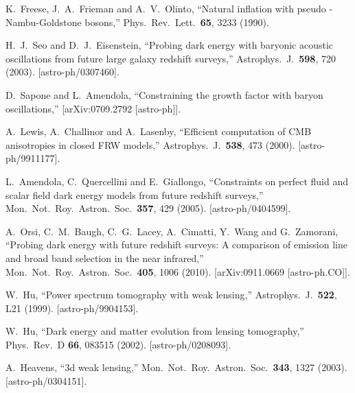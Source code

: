 \documentclass[12pt]{article}
\begin{document}
\begin{thebibliography}{99}
  K.~Freese, J.~A.~Frieman and A.~V.~Olinto,
  ``Natural inflation with pseudo - Nambu-Goldstone bosons,''
  Phys.\ Rev.\ Lett.\  {\bf 65}, 3233 (1990).
  
  
  
  H.~J.~Seo and D.~J.~Eisenstein,
  ``Probing dark energy with baryonic acoustic oscillations from future large galaxy redshift surveys,''
Astrophys.\ J.\  {\bf 598}, 720 (2003).
[astro-ph/0307460].


  D.~Sapone and L.~Amendola,
  ``Constraining the growth factor with baryon oscillations,''
[arXiv:0709.2792 [astro-ph]].

  A.~Lewis, A.~Challinor and A.~Lasenby,
  ``Efficient computation of CMB anisotropies in closed FRW models,''
Astrophys.\ J.\  {\bf 538}, 473 (2000).
[astro-ph/9911177].



  L.~Amendola, C.~Quercellini and E.~Giallongo,
  ``Constraints on perfect fluid and scalar field dark energy models from future redshift surveys,''
Mon.\ Not.\ Roy.\ Astron.\ Soc.\  {\bf 357}, 429 (2005).
[astro-ph/0404599].

  A.~Orsi, C.~M.~Baugh, C.~G.~Lacey, A.~Cimatti, Y.~Wang and G.~Zamorani,
  ``Probing dark energy with future redshift surveys: A comparison of emission line and broad band selection in the near infrared,''
Mon.\ Not.\ Roy.\ Astron.\ Soc.\  {\bf 405}, 1006 (2010).
[arXiv:0911.0669 [astro-ph.CO]].





  W.~Hu,
  ``Power spectrum tomography with weak lensing,''
Astrophys.\ J.\  {\bf 522}, L21 (1999).
[astro-ph/9904153].

 W.~Hu,
  ``Dark energy and matter evolution from lensing tomography,''
Phys.\ Rev.\ D {\bf 66}, 083515 (2002).
[astro-ph/0208093].

  A.~Heavens,
  ``3d weak lensing,''
Mon.\ Not.\ Roy.\ Astron.\ Soc.\  {\bf 343}, 1327 (2003).
[astro-ph/0304151].


\end{thebibliography}
\end{document}
